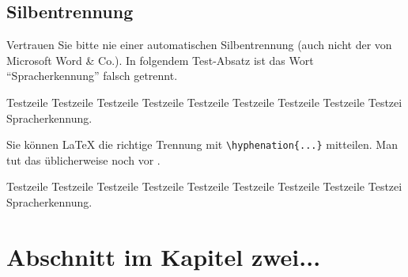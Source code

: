 \subsection{Silbentrennung}
Vertrauen Sie bitte nie einer automatischen Silbentrennung (auch nicht der von Microsoft Word \& Co.). In folgendem Test-Absatz ist das Wort "`Spracherkennung"' falsch getrennt.

Testzeile Testzeile Testzeile Testzeile Testzeile Testzeile Testzeile Testzeile Testzei Spracherkennung.

Sie können LaTeX die richtige Trennung mit \verb|\hyphenation{...}| mitteilen. Man tut das üblicherweise noch vor \verb||.

Testzeile Testzeile Testzeile Testzeile Testzeile Testzeile Testzeile Testzeile Testzei Spracherkennung.



\section{Abschnitt im Kapitel zwei...}
